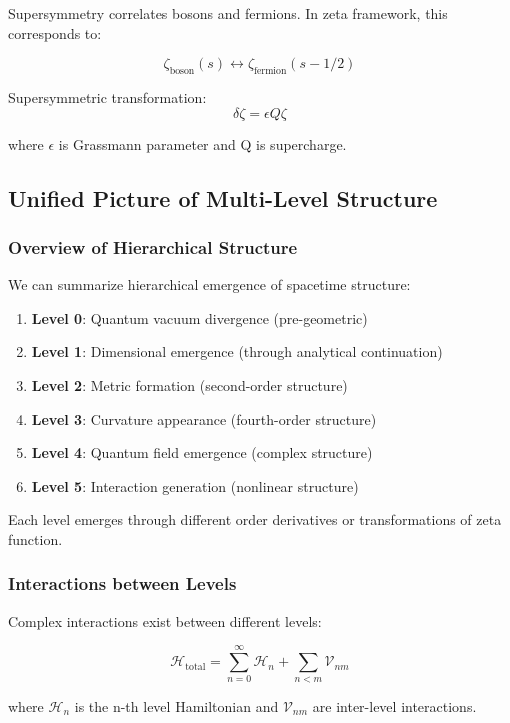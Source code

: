 \documentclass[12pt,a4paper]{article}
\begin{document}
Supersymmetry correlates bosons and fermions. In zeta framework, this corresponds to:

$$\zeta_{\text{boson}}(s) \leftrightarrow \zeta_{\text{fermion}}(s-1/2)$$

Supersymmetric transformation:
$$\delta \zeta = \epsilon Q \zeta$$

where $\epsilon$ is Grassmann parameter and Q is supercharge.

\subsection{Unified Picture of Multi-Level Structure}

\subsubsection{Overview of Hierarchical Structure}

We can summarize hierarchical emergence of spacetime structure:

\begin{enumerate}
\item \textbf{Level 0}: Quantum vacuum divergence (pre-geometric)
\item \textbf{Level 1}: Dimensional emergence (through analytical continuation)
\item \textbf{Level 2}: Metric formation (second-order structure)
\item \textbf{Level 3}: Curvature appearance (fourth-order structure)
\item \textbf{Level 4}: Quantum field emergence (complex structure)
\item \textbf{Level 5}: Interaction generation (nonlinear structure)
\end{enumerate}

Each level emerges through different order derivatives or transformations of zeta function.

\subsubsection{Interactions between Levels}

Complex interactions exist between different levels:

$$\mathcal{H}_{\text{total}} = \sum_{n=0}^{\infty} \mathcal{H}_n + \sum_{n<m} \mathcal{V}_{nm}$$

where $\mathcal{H}_n$ is the n-th level Hamiltonian and $\mathcal{V}_{nm}$ are inter-level interactions.
\end{document}
